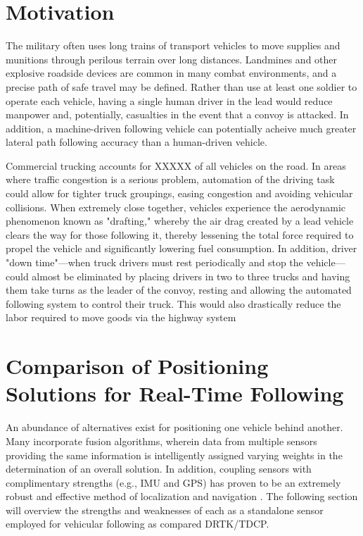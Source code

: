 \documentclass[12pt]{report}
\begin{document}
\section{Motivation} %
The military often uses long trains of transport vehicles to move supplies and munitions through perilous terrain over long distances. Landmines and other explosive roadside devices are common in many combat environments, and a precise path of safe travel may be defined. Rather than use at least one soldier to operate each vehicle, having a single human driver in the lead would reduce manpower and, potentially, casualties in the event that a convoy is attacked. In addition, a machine-driven following vehicle can potentially acheive much greater lateral path following accuracy than a human-driven vehicle.

Commercial trucking accounts for XXXXX of all vehicles on the road. In areas where traffic congestion is a serious problem, automation of the driving task could allow for tighter truck groupings, easing congestion and avoiding vehicular collisions. When extremely close together, vehicles experience the aerodynamic phenomenon known as "drafting," whereby the air drag created by a lead vehicle clears the way for those following it, thereby lessening the total force required to propel the vehicle and significantly lowering fuel consumption. In addition, driver "down time"---when truck drivers must rest periodically and stop the vehicle---could almost be eliminated by placing drivers in two to three trucks and having them take turns as the leader of the convoy, resting and allowing the automated following system to control their truck. This would also drastically reduce the labor required to move goods via the highway system

\section{Comparison of Positioning Solutions for Real-Time Following}
An abundance of alternatives exist for positioning one vehicle behind another. Many incorporate fusion algorithms, wherein data from multiple sensors providing the same information is intelligently assigned varying weights in the determination of an overall solution. In addition, coupling sensors with complimentary strengths (e.g., IMU and GPS) has proven to be an extremely robust and effective method of localization and navigation \cite{scottthesis}. The following section will overview the strengths and weaknesses of each as a standalone sensor employed for vehicular following as compared DRTK/TDCP.
\end{document}
